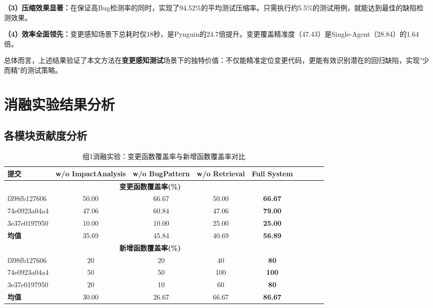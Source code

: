 \textbf{（3）压缩效果显著：}在保证高Bug检测率的同时，实现了94.52\%的平均测试压缩率。只需执行约5.5\%的测试用例，就能达到最佳的缺陷检测效果。

\textbf{（4）效率全面领先：}变更感知场景下总耗时仅18秒，是Pynguin的24.7倍提升。变更覆盖精准度（47.43）是Single-Agent（28.84）的1.64倍。

总体而言，上述结果验证了本文方法在\textbf{变更感知测试}场景下的独特价值：不仅能精准定位变更代码，更能有效识别潜在的回归缺陷，实现"少而精"的测试策略。

\section{消融实验结果分析}
\label{sec:ablation_results}

\subsection{各模块贡献度分析}
\label{ssec:module_contribution}

\begin{table}[htbp]
    \centering
    \caption{组1消融实验：变更函数覆盖率与新增函数覆盖率对比}
    \label{tab:ablation-group1-coverage}
    \begin{tabular}{lcccccccc}
        \toprule
        \textbf{提交} & \textbf{w/o ImpactAnalysis} & \textbf{w/o BugPattern} & \textbf{w/o Retrieval} & \textbf{Full System} \\
        \midrule
        \multicolumn{5}{c}{\textbf{变更函数覆盖率(\%)}} \\
        \midrule
        f398fb127606 & 50.00 & 66.67 & 50.00 & \textbf{66.67} \\
        74e0923a04a4 & 47.06 & 60.84 & 47.06 & \textbf{79.00} \\
        3e37e0197950 & 10.00 & 10.00 & 25.00 & \textbf{25.00} \\
        \midrule
        \textbf{均值} & 35.69 & 45.84 & 40.69 & \textbf{56.89} \\
        \midrule
        \multicolumn{5}{c}{\textbf{新增函数覆盖率(\%)}} \\
        \midrule
        f398fb127606 & 20 & 20 & 40 & \textbf{80} \\
        74e0923a04a4 & 50 & 50 & 100 & \textbf{100} \\
        3e37e0197950 & 20 & 10 & 60 & \textbf{80} \\
        \midrule
        \textbf{均值} & 30.00 & 26.67 & 66.67 & \textbf{86.67} \\
        \bottomrule
    \end{tabular}
\end{table}


